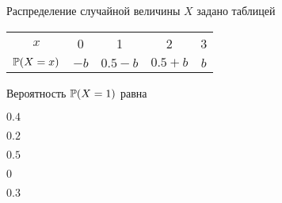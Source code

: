 
\begin{question}
Распределение случайной величины \(X\) задано таблицей

\begin{center}
\begin{tabular}{ccccc}
\toprule
$x$ & 0 & 1 & 2 & 3 \\ 
$\P(X=x)$ & $-b$ & $0.5-b$ & $0.5+b$ & $b$ \\
\bottomrule
\end{tabular}
\end{center}

Вероятность \(\P(X=1)\) равна
\begin{answerlist}
  \item \(0.4\)
  \item \(0.2\)
  \item \(0.5\)
  \item \(0\)
  \item \(0.3\)
\end{answerlist}
\end{question}



